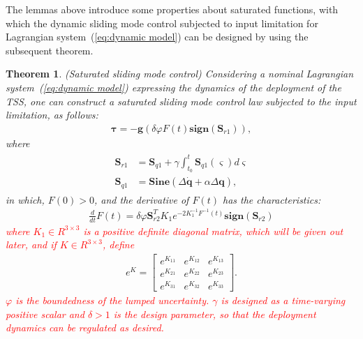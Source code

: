 \documentclass[3p]{elsarticle}
\theoremstyle{plain}
\newtheorem{mythm}{Theorem}
\theoremstyle{remark}
\begin{document}
The lemmas above introduce some properties about saturated functions, with which the dynamic sliding mode control subjected to input limitation for Lagrangian system~(\ref{eq:dynamic model}) can be designed by using the subsequent theorem.
\begin{mythm}\label{thm:1}(Saturated sliding mode control)
Considering a nominal Lagrangian system~(\ref{eq:dynamic model}) expressing the dynamics of the deployment of the TSS, one can construct a saturated sliding mode control law subjected to the input limitation, as follows:
\begin{align}
\bm\tau = -\bm{g}(\delta\varphi F(t) \bm{sign}(\bm S_{r1})),\label{eq:slider control}
\end{align}
where
\begin{align}
\begin{split}
\bm S_{r1} &= \bm S_{q1}+\gamma\int^t_{t_0}\bm S_{q1}(\varsigma) d\varsigma\\
\bm S_{q1} &= \bm{Sine}(\Delta \dot {\bm q}+\alpha\Delta\bm q),
\end{split}
\end{align}
in which, $F(0)>0$, and the derivative of $F(t)$ has the characteristics:
\begin{align}
\frac{d}{dt}F(t) = \delta\varphi \bm S_{r2}^T K_1e^{-2K_1^{-1}F^{-1}(t)}\bm{sign}(\bm S_{r2})
\end{align}
\textcolor{red}{where $K_1\in R^{3\times 3}$ is a positive definite diagonal matrix, which will be given out later, and if $K\in R^{3\times 3}$, define}
\begin{align}
e^K=
\begin{bmatrix}
e^{K_{11}}&e^{K_{12}}&e^{K_{13}}\\
e^{K_{21}}&e^{K_{22}}&e^{K_{23}}\\
e^{K_{31}}&e^{K_{32}}&e^{K_{33}}
\end{bmatrix}.
\end{align}
\textcolor{red}{$\varphi$ is the boundedness of the lumped uncertainty. $\gamma$ is designed as a time-varying positive scalar and $\delta>1$ is the design parameter, so that the deployment dynamics can be regulated as desired.}
\end{mythm}
\end{document}

